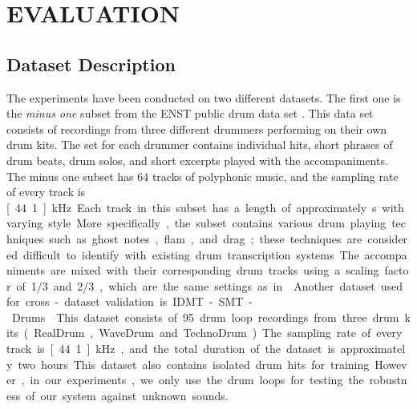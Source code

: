 \documentclass{article}
\begin{document}
\section{EVALUATION}\label{sec:Evaluation}
\subsection{Dataset Description}\label{subsec:data set description}
The experiments have been conducted on two different datasets. The first one is the \textit{minus one} subset from the ENST public drum data set \cite{gillet_enst-drums:_2006}. This data set consists of recordings from three different drummers performing on their own drum kits. The set for each drummer contains individual hits, short phrases of drum beats, drum solos, and short excerpts played with the accompaniments. The minus one subset has 64 tracks of polyphonic music, and the sampling rate of every track is \unit[44.1]{kHz}. Each track in this subset has a length of approximately \unit[70]{s} with varying style. More specifically, the subset contains various drum playing techniques such as ghost notes, flam, and drag; these techniques are considered difficult to identify with existing drum transcription systems. The accompaniments are mixed with their corresponding drum tracks using a scaling factor of 1/3 and 2/3, which are the same settings as in \cite{Paulus2009a}. %
 

Another dataset used for cross-dataset validation is IDMT-SMT-Drums \cite{Dittmar2014}. This dataset consists of 95 drum loop recordings from three drum kits (RealDrum, WaveDrum and TechnoDrum). The sampling rate of every track is \unit[44.1]{kHz}, and the total duration of the dataset is approximately two hours. This dataset also contains isolated drum hits for training. However, in our experiments, we only use the drum loops for testing the robustness of our system against unknown sounds.   
\end{document}
